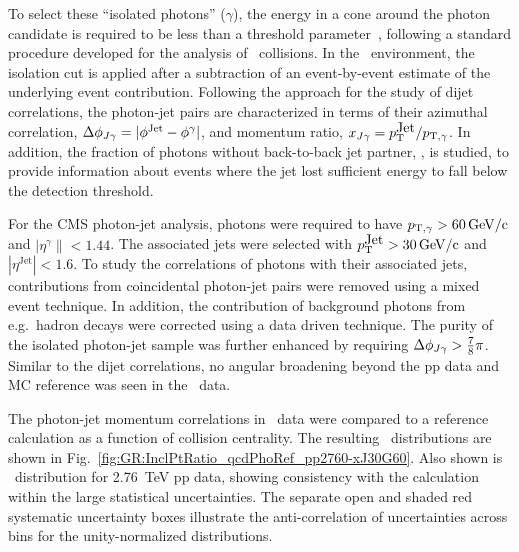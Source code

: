 To select these ``isolated photons'' ($\gamma$), the energy in a cone around 
the photon candidate is required to be less than a threshold parameter~\cite{HIPhoton},
following a standard procedure developed for the analysis of \pp\ collisions. In the \PbPb\ 
environment, the isolation cut is applied after a subtraction of an event-by-event 
estimate of the underlying event contribution.
Following the approach for the study of dijet correlations, the photon-jet pairs 
are characterized in terms of their azimuthal correlation, $\Delta\phi_{J\gamma} = |\phi^\mathrm{Jet} - \phi^{\gamma}|$,
 and momentum ratio, $x_{J\gamma} = p_{\mathrm{T}}^{\mbox{Jet}}/p_{\mathrm{T},\gamma}$. In addition, the fraction of photons without 
back-to-back jet partner,  \rjg, is studied, to provide information about 
events where the jet lost sufficient energy to fall below the detection threshold.

For the CMS photon-jet analysis, photons were required to have $p_{\mathrm{T},\gamma} > 60\,\mathrm{GeV/c}$
and  $|\eta^\gamma\|<1.44$. The associated jets were selected with
$p_{\mathrm{T}}^{\mbox{Jet}} > 30\,\mathrm{GeV/c}$ and $|\eta^{\mbox{Jet}}|<1.6$. To study the correlations of 
photons with their associated jets, contributions from 
coincidental photon-jet pairs were removed using a mixed event technique. In 
addition, the contribution of background photons from e.g.\ hadron decays 
were corrected using a data driven technique. The purity of the isolated photon-jet
sample was further enhanced by requiring $\Delta\phi_{J\gamma} > \frac{7}{8}\pi$.
Similar to the dijet correlations, no angular broadening 
beyond the pp data and MC reference was seen in the \PbPb\ data.

The photon-jet momentum correlations in \PbPb\ data were compared to a \PYTHYD reference 
calculation as a function of collision centrality. The resulting 
\xjg\ distributions are shown in Fig.~\ref{fig:GR:InclPtRatio_qcdPhoRef_pp2760-xJ30G60}.
Also shown is \avexjg\ distribution for 2.76~TeV pp data, showing consistency 
with the \PYTHYD calculation within the large statistical uncertainties.
The separate open and shaded red systematic uncertainty boxes illustrate the 
anti-correlation of uncertainties across bins for the unity-normalized distributions.

